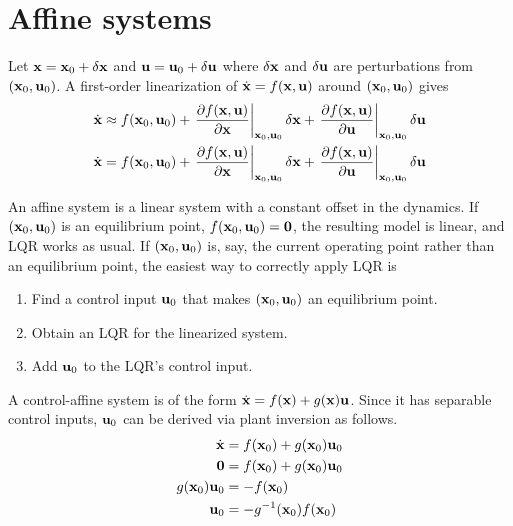 \section{Affine systems}

Let $\mathbf{x} = \mathbf{x}_0 + \delta\mathbf{x}$ and
$\mathbf{u} = \mathbf{u}_0 + \delta\mathbf{u}$ where $\delta\mathbf{x}$ and $\delta\mathbf{u}$
are perturbations from $(\mathbf{x}_0, \mathbf{u}_0)$. A first-order linearization of
$\dot{\mathbf{x}} = f(\mathbf{x}, \mathbf{u})$ around $(\mathbf{x}_0, \mathbf{u}_0)$ gives
\begin{align*}
  \dot{\mathbf{x}} &\approx f(\mathbf{x}_0, \mathbf{u}_0) +
    \left.\frac{\partial f(\mathbf{x}, \mathbf{u})}{\partial \mathbf{x}}
    \right|_{\mathbf{x}_0, \mathbf{u}_0}\delta\mathbf{x} +
    \left.\frac{\partial f(\mathbf{x}, \mathbf{u})}{\partial \mathbf{u}}
    \right|_{\mathbf{x}_0, \mathbf{u}_0}\delta\mathbf{u} \\
  \dot{\mathbf{x}} &= f(\mathbf{x}_0, \mathbf{u}_0) +
    \left.\frac{\partial f(\mathbf{x}, \mathbf{u})}{\partial \mathbf{x}}
    \right|_{\mathbf{x}_0, \mathbf{u}_0}\delta\mathbf{x} +
    \left.\frac{\partial f(\mathbf{x}, \mathbf{u})}{\partial \mathbf{u}}
    \right|_{\mathbf{x}_0, \mathbf{u}_0}\delta\mathbf{u}
\end{align*}

An affine system is a linear system with a constant offset in the dynamics. If
$(\mathbf{x}_0, \mathbf{u}_0)$ is an equilibrium point,
$f(\mathbf{x}_0, \mathbf{u}_0) = \mathbf{0}$, the resulting \gls{model} is linear, and
LQR works as usual. If $(\mathbf{x}_0, \mathbf{u}_0)$ is, say, the current operating
point rather than an equilibrium point, the easiest way to correctly apply LQR
is
\begin{enumerate}
  \item Find a control input $\mathbf{u}_0$ that makes $(\mathbf{x}_0, \mathbf{u}_0)$ an
    equilibrium point.
  \item Obtain an LQR for the linearized system.
  \item Add $\mathbf{u}_0$ to the LQR's control input.
\end{enumerate}

A control-affine system is of the form
$\dot{\mathbf{x}} = f(\mathbf{x}) + g(\mathbf{x})\mathbf{u}$. Since it has separable control
inputs, $\mathbf{u}_0$ can be derived via plant inversion as follows.
\begin{align}
  \dot{\mathbf{x}} &= f(\mathbf{x}_0) + g(\mathbf{x}_0)\mathbf{u}_0 \nonumber \\
  \mathbf{0} &= f(\mathbf{x}_0) + g(\mathbf{x}_0)\mathbf{u}_0 \nonumber \\
  g(\mathbf{x}_0)\mathbf{u}_0 &= -f(\mathbf{x}_0) \nonumber \\
  \mathbf{u}_0 &= -g^{-1}(\mathbf{x}_0) f(\mathbf{x}_0)
\end{align}

